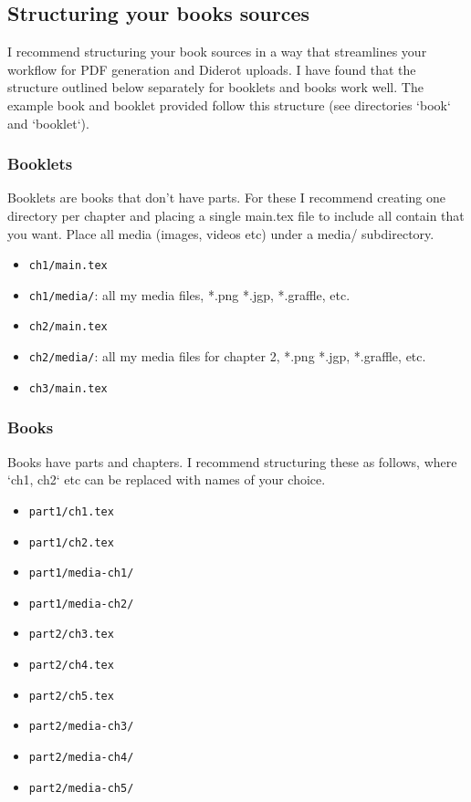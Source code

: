\subsection{Structuring your books sources}


I recommend structuring your book sources in a way that streamlines your workflow for PDF generation and Diderot uploads.  I have found that the structure outlined below separately for booklets and books work well.  The example book and booklet provided follow this structure (see directories `book` and `booklet`).

\subsubsection{Booklets}
 
 Booklets are books that don't have parts. For these  I recommend creating one directory per chapter and placing a single main.tex file to include all contain that you want.  Place all media (images, videos etc) under a media/ subdirectory. 
\begin{itemize}  
\item \lstinline`ch1/main.tex`
\item \lstinline`ch1/media/`: all my media files, *.png *.jgp, *.graffle, etc.
\item \lstinline`ch2/main.tex`
\item \lstinline`ch2/media/`: all my media files for chapter 2, *.png *.jgp, *.graffle, etc.
\item \lstinline`ch3/main.tex`
\end{itemize}

\subsubsection{Books}

Books have parts and chapters. I recommend structuring these as follows, where `ch1, ch2` etc can be replaced with names of your choice.
%
\begin{itemize}
\item \lstinline`part1/ch1.tex`
\item \lstinline`part1/ch2.tex`
\item \lstinline`part1/media-ch1/`
\item \lstinline`part1/media-ch2/`
\item \lstinline`part2/ch3.tex`
\item \lstinline`part2/ch4.tex`
\item \lstinline`part2/ch5.tex`
\item \lstinline`part2/media-ch3/`
\item \lstinline`part2/media-ch4/`
\item \lstinline`part2/media-ch5/`
\end{itemize}
   
